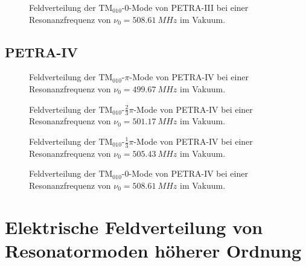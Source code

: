 \begin{figure}[p]
  \centering
  
  \caption[Feldverteilung der $\mathrm{TM}_{010}\text{-}0$-Mode von PETRA-III]{Feldverteilung der $\mathrm{TM}_{010}\text{-}0$-Mode von PETRA-III bei einer Resonanzfrequenz von $\nu_0 = \SI{508.61}{MHz}$ im Vakuum.}
\end{figure}
\FloatBarrier

\clearpage
\subsection{PETRA-IV}
\FloatBarrier
\begin{figure}[h]
  \centering
  
  \caption[Feldverteilung der $\mathrm{TM}_{010}\text{-}\pi$-Mode von PETRA-IV]{Feldverteilung der $\mathrm{TM}_{010}\text{-}\pi$-Mode von PETRA-IV bei einer Resonanzfrequenz von $\nu_0 = \SI{499.67}{MHz}$ im Vakuum.}
\end{figure}

\begin{figure}[p]
	\centering
  
	
	\caption[Feldverteilung der $\mathrm{TM}_{010}\text{-}\frac{2}{3}\pi$-Mode von PETRA-IV]{Feldverteilung der $\mathrm{TM}_{010}\text{-}\frac{2}{3}\pi$-Mode von PETRA-IV bei einer Resonanzfrequenz von $\nu_0 = \SI{501.17}{MHz}$ im Vakuum.}
	
    
    \caption[Feldverteilung der $\mathrm{TM}_{010}\text{-}\frac{1}{3}\pi$-Mode von PETRA-IV]{Feldverteilung der $\mathrm{TM}_{010}\text{-}\frac{1}{3}\pi$-Mode von PETRA-IV bei einer Resonanzfrequenz von $\nu_0 = \SI{505.43}{MHz}$ im Vakuum.}
\end{figure}

\begin{figure}[h]
  \centering
  
  \caption[Feldverteilung der $\mathrm{TM}_{010}\text{-}0$-Mode von PETRA-IV]{Feldverteilung der $\mathrm{TM}_{010}\text{-}0$-Mode von PETRA-IV bei einer Resonanzfrequenz von $\nu_0 = \SI{508.61}{MHz}$ im Vakuum.}
\end{figure}
\FloatBarrier

\clearpage
\section{Elektrische Feldverteilung von Resonatormoden höherer Ordnung}
\label{app:hom_felder}
\FloatBarrier

